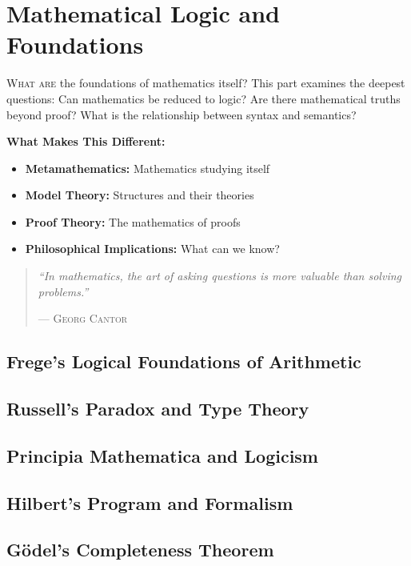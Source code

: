 \part{Mathematical Logic and Foundations}
\label{part:foundations-logic}

\begin{partintro}
\lettrine[lines=3]{W}{hat are} the foundations of mathematics itself? This part examines the deepest questions: Can mathematics be reduced to logic? Are there mathematical truths beyond proof? What is the relationship between syntax and semantics?

\vspace{1em}
\textbf{What Makes This Different:}
\begin{itemize}[noitemsep]
    \item \textbf{Metamathematics:} Mathematics studying itself
    \item \textbf{Model Theory:} Structures and their theories
    \item \textbf{Proof Theory:} The mathematics of proofs
    \item \textbf{Philosophical Implications:} What can we know?
\end{itemize}

\begin{quote}
\textit{``In mathematics, the art of asking questions is more valuable than solving problems.''}

\hfill--- \textsc{Georg Cantor}
\end{quote}
\end{partintro}

\chapter{Frege's Logical Foundations of Arithmetic}
\chapter{Russell's Paradox and Type Theory}
\chapter{Principia Mathematica and Logicism}
\chapter{Hilbert's Program and Formalism}
\chapter{Gödel's Completeness Theorem}
